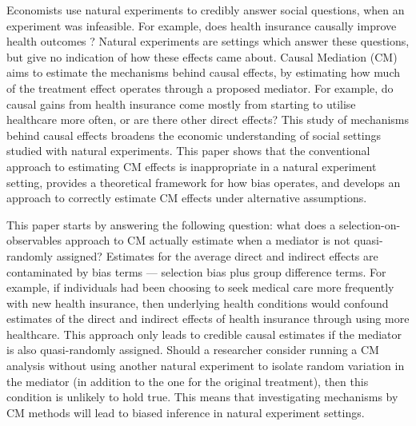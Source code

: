 Economists use natural experiments to credibly answer social questions, when an experiment was infeasible.
For example, does health insurance causally improve health outcomes \citep{finkelstein2008oregon}?
Natural experiments are settings which answer these questions, but give no indication of how these effects came about.
Causal Mediation (CM) aims to estimate the mechanisms behind causal effects, by estimating how much of the treatment effect operates through a proposed mediator.
For example, do causal gains from health insurance come mostly from starting to utilise healthcare more often, or are there other direct effects?
This study of mechanisms behind causal effects broadens the economic understanding of social settings studied with natural experiments.
This paper shows that the conventional approach to estimating CM effects is inappropriate in a natural experiment setting, provides a theoretical framework for how bias operates, and develops an approach to correctly estimate CM effects under alternative assumptions.


This paper starts by answering the following question: what does a selection-on-observables approach to CM actually estimate when a mediator is not quasi-randomly assigned?
Estimates for the average direct and indirect effects are contaminated by bias terms --- selection bias plus group difference terms.
For example, if individuals had been choosing to seek medical care more frequently with new health insurance, then underlying health conditions 
would confound estimates of the direct and indirect effects of health insurance through using more healthcare.
This approach only leads to credible causal estimates if the mediator is also quasi-randomly assigned.
Should a researcher consider running a CM analysis without using another natural experiment to isolate random variation in the mediator (in addition to the one for the original treatment), then this condition is unlikely to hold true.
This means that investigating mechanisms by CM methods will lead to biased inference in natural experiment settings.

